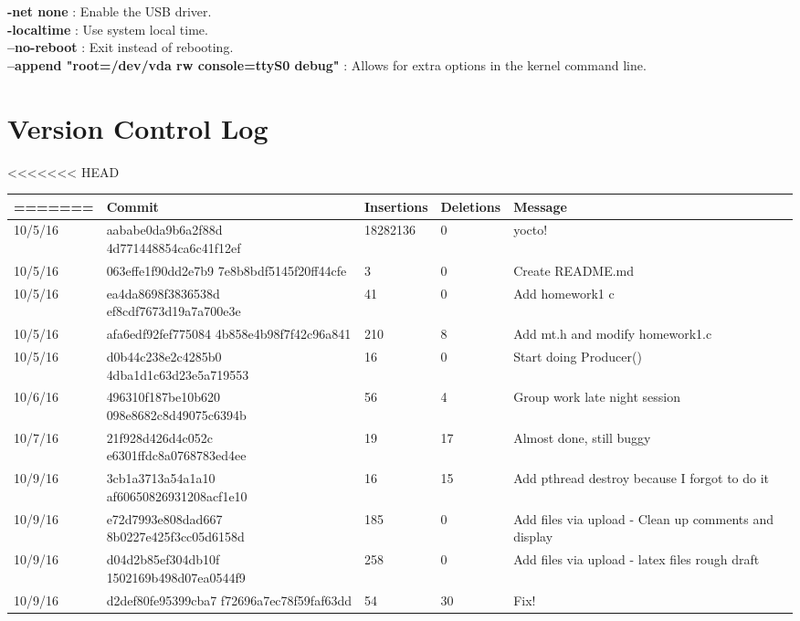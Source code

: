 \documentclass[letterpaper,10pt,draftclsnofoot,titlepage,onecolumn]{IEEEtran}
\begin{document}
	\textbf{-net none} : Enable the USB driver. \\
	
	\textbf{-localtime} : Use system local time. \\
	
	\textbf{--no-reboot} : Exit instead of rebooting. \\
	
	\textbf{--append "root=/dev/vda rw console=ttyS0 debug"} : Allows for extra options in the kernel command line. \\
	
	\clearpage
	\section{Version Control Log}
	
\begin{center}
<<<<<<< HEAD
\begin{tabular}{ |m{2cm}|m{5cm}|m{1cm}|m{1cm}|m{5cm}| }
=======
 \begin{tabular}{| m{2cm} | m{5cm} | m{2cm} | m{2cm} | m{3cm} | } 
>>>>>>> 69d27f0b363fef5f45180384096781e1c3811512
 \hline
 Date & Commit & Insertions & Deletions & Message \\ [0.5ex] 
 \hline\hline
  10/5/16 & aababe0da9b6a2f88d 4d771448854ca6c41f12ef & 18282136 & 0 & yocto! \\
 \hline
  10/5/16 & 063effe1f90dd2e7b9 7e8b8bdf5145f20ff44cfe & 3 & 0 & Create README.md \\
 \hline
  10/5/16 & ea4da8698f3836538d ef8cdf7673d19a7a700e3e & 41 & 0 & Add homework1 c \\
 \hline
  10/5/16 & afa6edf92fef775084 4b858e4b98f7f42c96a841 & 210 & 8 & Add mt.h and modify homework1.c \\
 \hline
  10/5/16 & d0b44c238e2c4285b0 4dba1d1c63d23e5a719553 & 16 & 0 & Start doing Producer() \\
 \hline
  10/6/16 & 496310f187be10b620 098e8682c8d49075c6394b & 56 & 4 & Group work late night session \\
 \hline
   10/7/16 & 21f928d426d4c052c e6301ffdc8a0768783ed4ee & 19 & 17 & Almost done, still buggy \\
 \hline
   10/9/16 & 3cb1a3713a54a1a10 af60650826931208acf1e10 & 16 & 15 & Add pthread destroy because I forgot to do it \\
 \hline
   10/9/16 & e72d7993e808dad667 8b0227e425f3cc05d6158d & 185 & 0 & Add files via upload - Clean up comments and display\\
 \hline
   10/9/16 & d04d2b85ef304db10f 1502169b498d07ea0544f9 & 258 & 0 & Add files via upload - latex files rough draft\\
 \hline
   10/9/16 & d2def80fe95399cba7 f72696a7ec78f59faf63dd & 54 & 30 & Fix!\\
 \hline
 
\end{tabular}
\end{center}
	
\end{document}

